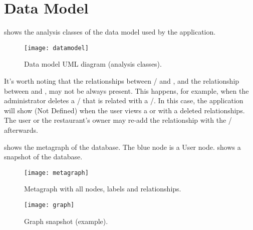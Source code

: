 \chapter{Data Model}\label{ch:datamodel}

 shows the analysis classes of the data model used by the
application.

\begin{figure}[htb]
	\texttt{[image: datamodel]}
	\caption{Data model UML diagram (analysis classes).}\label{fig:datamodel}
\end{figure}

It's worth noting that the relationships between /
and , and the relationship between  and
, may not be always present. This happens, for example, when the
administrator deletes a / that is related with a
/. In this case, the application will show
 (Not Defined) when the user views a  or 
with a deleted relationships. The user or the restaurant's owner may re-add the
relationship with the / afterwards.

 shows the metagraph of the database. The blue node is a
User node.  shows a snapshot of the database.

\begin{figure}[htb]
	\centering
	\texttt{[image: metagraph]}
	\caption{Metagraph with all nodes, labels and
	relationships.}\label{fig:metagraph}
\end{figure}

\begin{figure}[htb]
	\centering
	\texttt{[image: graph]}
	\caption{Graph snapshot (example).}\label{fig:graphsnapshot}
\end{figure}

